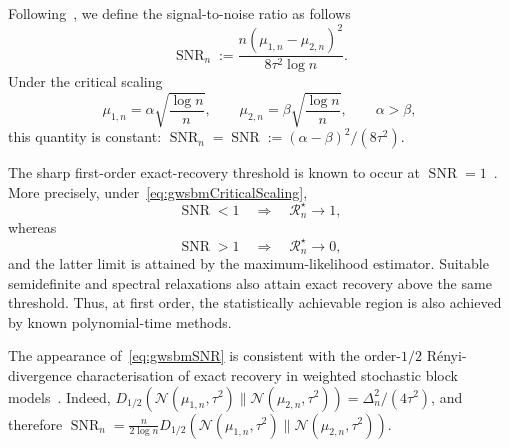 \documentclass[11pt]{article}
\theoremstyle{definition}
\theoremstyle{remark}
\newcommand{\1}{\boldsymbol{1}}
\begin{document}
Following~\cite{PandeyKulkarni2024}, we define the signal-to-noise
ratio as follows
\begin{equation}
\operatorname{SNR}_n
:=
\frac{n(\mu_{1,n}-\mu_{2,n})^2}{8\tau^2\log n}.
\label{eq:gwsbmSNR}
\end{equation}
Under the critical scaling
\begin{equation}
\mu_{1,n}
=
\alpha\sqrt{\frac{\log n}{n}},
\qquad
\mu_{2,n}
=
\beta\sqrt{\frac{\log n}{n}},
\qquad
\alpha>\beta,
\label{eq:gwsbmCriticalScaling}
\end{equation}
this quantity is constant:
\(\operatorname{SNR}_n=\operatorname{SNR}
:=(\alpha-\beta)^2/(8\tau^2)\).

The sharp first-order exact-recovery threshold is known to occur at
$\operatorname{SNR}=1$~\cite{PandeyKulkarni2024}. More precisely,
under~\eqref{eq:gwsbmCriticalScaling},
\begin{equation}
\operatorname{SNR}<1
\quad\Longrightarrow\quad
\mathcal R_n^\star\longrightarrow1,
\label{eq:gwsbmKnownImpossibility}
\end{equation}
whereas
\begin{equation}
\operatorname{SNR}>1
\quad\Longrightarrow\quad
\mathcal R_n^\star\longrightarrow0,
\label{eq:gwsbmKnownPossibility}
\end{equation}
and the latter limit is attained by the maximum-likelihood estimator.
Suitable semidefinite and spectral relaxations also attain exact recovery
above the same threshold.  Thus, at first order, the statistically
achievable region is also achieved by known polynomial-time methods.

The appearance of~\eqref{eq:gwsbmSNR} is consistent with the
order-$1/2$ R\'enyi-divergence characterisation of exact recovery in
weighted stochastic block models~\cite{JogLoh2015}. Indeed,
\(D_{1/2}(\mathcal N(\mu_{1,n},\tau^2)\|\mathcal
N(\mu_{2,n},\tau^2))=\Delta_n^2/(4\tau^2)\), and therefore
\(\operatorname{SNR}_n=\frac{n}{2\log n}
D_{1/2}(\mathcal N(\mu_{1,n},\tau^2)\|\mathcal
N(\mu_{2,n},\tau^2))\).
\end{document}
